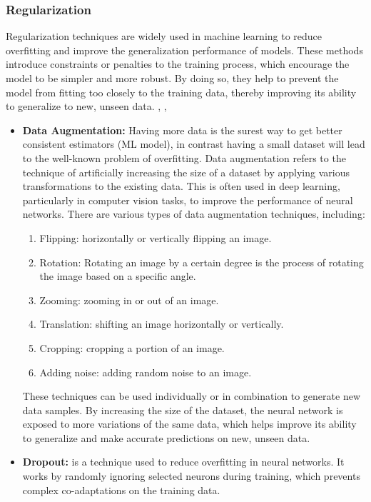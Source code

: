\begin{itemize}
\subsubsection{Regularization}
Regularization techniques are widely used in machine learning to reduce overfitting and improve the generalization performance of models. These methods introduce constraints or penalties to the training process, which encourage the model to be simpler and more robust. By doing so, they help to prevent the model from fitting too closely to the training data, thereby improving its ability to generalize to new, unseen data. \cite{goodfellow2016deep}, \cite{ansari2020building}, \cite{bishop2006pattern}
\begin{itemize}
    \item \textbf{Data Augmentation: }
    Having more data is the surest way to get better consistent estimators (ML model), in contrast having a small dataset will lead to the well-known problem of overfitting.
    Data augmentation refers to the technique of artificially increasing the size of a dataset by applying various transformations to the existing data. This is often used in deep learning, particularly in computer vision tasks, to improve the performance of neural networks.
    There are various types of data augmentation techniques, including:
    \begin{enumerate}
        \item  Flipping: horizontally or vertically flipping an image.
        \item Rotation: Rotating an image by a certain degree is the process of rotating the image based on a specific angle.
        \item Zooming: zooming in or out of an image.
        \item Translation: shifting an image horizontally or vertically.
        \item Cropping: cropping a portion of an image.
        \item Adding noise: adding random noise to an image.
        
    \end{enumerate}
    
    These techniques can be used individually or in combination to generate new data samples. By increasing the size of the dataset, the neural network is exposed to more variations of the same data, which helps improve its ability to generalize and make accurate predictions on new, unseen data. \cite{shorten2019survey}\\
    \item \textbf{Dropout: } is a technique used to reduce overfitting in neural networks. It works by randomly ignoring selected neurons during training, which prevents complex co-adaptations on the training data. 


\end{itemize}
\end{itemize}
